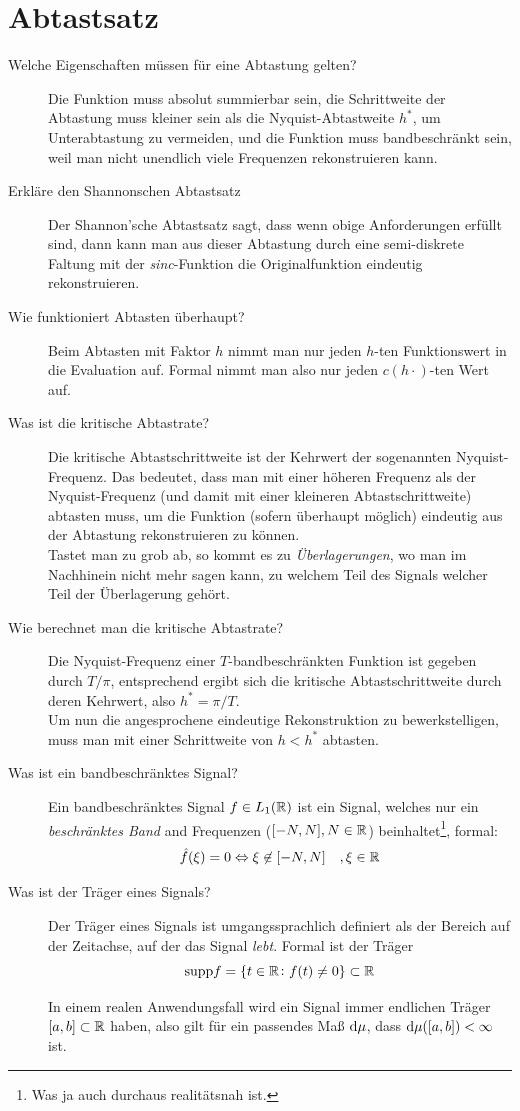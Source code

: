 \section{Abtastsatz}
\begin{description}
	\item[Welche Eigenschaften müssen für eine Abtastung gelten?]
  	Die Funktion muss absolut summierbar sein, die Schrittweite der Abtastung muss kleiner sein als die 
    Nyquist-Abtastweite $h^*$, um 
  	Unterabtastung zu vermeiden, und die Funktion muss bandbeschränkt sein, weil man nicht 
  	unendlich viele Frequenzen rekonstruieren kann.
	\item[Erkläre den Shannonschen Abtastsatz]
      Der Shannon'sche Abtastsatz sagt, dass wenn obige Anforderungen erfüllt sind, 
      dann kann man aus dieser Abtastung durch eine semi-diskrete Faltung mit der \emph{sinc}-Funktion
      die Originalfunktion eindeutig rekonstruieren.
	\item[Wie funktioniert Abtasten überhaupt?]
      Beim Abtasten mit Faktor $h$ nimmt man nur jeden $h$-ten Funktionswert in die Evaluation auf.
      Formal nimmt man also nur jeden $c(h\cdot)$-ten Wert auf.
	\item[Was ist die kritische Abtastrate?]
      Die kritische Abtastschrittweite ist der Kehrwert der sogenannten Nyquist-Frequenz. Das bedeutet, dass
      man mit einer höheren Frequenz als der Nyquist-Frequenz (und damit mit einer kleineren Abtastschrittweite) 
      abtasten muss, um die Funktion (sofern überhaupt möglich) eindeutig aus der Abtastung rekonstruieren zu können.\\
      Tastet man zu grob ab, so kommt es zu \emph{Überlagerungen}, wo man im Nachhinein nicht mehr sagen kann, zu welchem
      Teil des Signals welcher Teil der Überlagerung gehört.
	\item[Wie berechnet man die kritische Abtastrate?]
      Die Nyquist-Frequenz einer $T$-bandbeschränkten Funktion ist gegeben durch $T/\pi$, entsprechend ergibt sich
      die kritische Abtastschrittweite durch deren Kehrwert, also $h^* = \pi/T$.\\
      Um nun die angesprochene eindeutige Rekonstruktion zu bewerkstelligen, muss man mit einer Schrittweite von
      $h < h^*$ abtasten.
	\item[Was ist ein bandbeschränktes Signal?]
      Ein bandbeschränktes Signal $f\in L_1(\mathbb{R})$ ist ein Signal, welches nur ein \emph{beschränktes Band} and Frequenzen
      ($[-N,N], N\in\mathbb{R}$) beinhaltet\footnote{Was ja auch durchaus realitätsnah ist.}, formal:
      $$ \hat f(\xi) = 0 \Leftrightarrow \xi \not\in [-N,N]\quad,\xi\in\mathbb{R} $$
	\item[Was ist der Träger eines Signals?]
      Der Träger eines Signals ist umgangssprachlich definiert als der Bereich auf der Zeitachse, auf der
      das Signal \emph{lebt}. Formal ist der Träger
      $$ \text{supp} f = \{t \in \mathbb{R} \colon f(t) \neq 0 \} \subset \mathbb{R} $$

      In einem realen Anwendungsfall wird ein Signal immer endlichen Träger $[a,b]\subset\mathbb{R}$ haben, 
      also gilt für ein passendes Maß $\text{d} \mu$, dass $\text{d} \mu([a,b]) < \infty$ ist.
\end{description}

